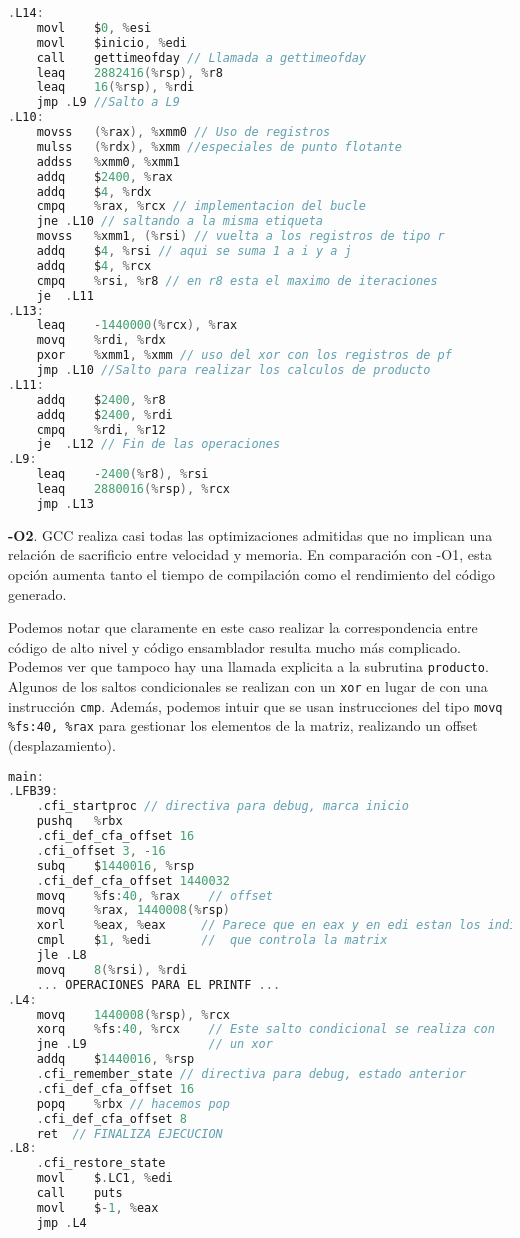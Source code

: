 \documentclass[10pt,a4paper]{article}
\begin{document}
\begin{lstlisting}[language=C]
.L14:
	movl	$0, %esi
	movl	$inicio, %edi
	call	gettimeofday // Llamada a gettimeofday
	leaq	2882416(%rsp), %r8		
	leaq	16(%rsp), %rdi
	jmp	.L9 //Salto a L9
.L10:
	movss	(%rax), %xmm0 // Uso de registros 
	mulss	(%rdx), %xmm //especiales de punto flotante
	addss	%xmm0, %xmm1
	addq	$2400, %rax 
	addq	$4, %rdx
	cmpq	%rax, %rcx // implementacion del bucle
	jne	.L10 // saltando a la misma etiqueta
	movss	%xmm1, (%rsi) // vuelta a los registros de tipo r
	addq	$4, %rsi // aqui se suma 1 a i y a j 
	addq	$4, %rcx
	cmpq	%rsi, %r8 // en r8 esta el maximo de iteraciones 
	je	.L11  
.L13:
	leaq	-1440000(%rcx), %rax
	movq	%rdi, %rdx
	pxor	%xmm1, %xmm // uso del xor con los registros de pf
	jmp	.L10 //Salto para realizar los calculos de producto 
.L11:
	addq	$2400, %r8
	addq	$2400, %rdi
	cmpq	%rdi, %r12
	je	.L12 // Fin de las operaciones 
.L9:
	leaq	-2400(%r8), %rsi  
	leaq	2880016(%rsp), %rcx
	jmp	.L13

\end{lstlisting}

\textbf{-O2}. GCC realiza casi todas las optimizaciones admitidas que no implican una relación de sacrificio entre velocidad y memoria. En comparación con -O1, esta opción aumenta tanto el tiempo de compilación como el rendimiento del código generado. 

Podemos notar que claramente en este caso realizar la correspondencia entre código de alto nivel y código ensamblador resulta mucho más complicado. Podemos ver que tampoco hay una llamada explicita a la subrutina \texttt{producto}. Algunos de los saltos condicionales se realizan con un \texttt{xor} en lugar de con una instrucción \texttt{cmp}. Además, podemos intuir que se usan instrucciones del tipo \texttt{movq \%fs:40, \%rax} para gestionar los elementos de la matriz, realizando un offset (desplazamiento).
\begin{lstlisting}[language=C]
main:
.LFB39:
	.cfi_startproc // directiva para debug, marca inicio
	pushq	%rbx  
	.cfi_def_cfa_offset 16
	.cfi_offset 3, -16
	subq	$1440016, %rsp
	.cfi_def_cfa_offset 1440032
	movq	%fs:40, %rax	// offset 
	movq	%rax, 1440008(%rsp)
	xorl	%eax, %eax     // Parece que en eax y en edi estan los indices
	cmpl	$1, %edi       //  que controla la matrix
	jle	.L8
	movq	8(%rsi), %rdi 
	... OPERACIONES PARA EL PRINTF ...
.L4:
	movq	1440008(%rsp), %rcx	
	xorq	%fs:40, %rcx    // Este salto condicional se realiza con 
	jne	.L9                 // un xor
	addq	$1440016, %rsp
	.cfi_remember_state // directiva para debug, estado anterior
	.cfi_def_cfa_offset 16
	popq	%rbx // hacemos pop 
	.cfi_def_cfa_offset 8
	ret  // FINALIZA EJECUCION 
.L8:
	.cfi_restore_state
	movl	$.LC1, %edi
	call	puts
	movl	$-1, %eax
	jmp	.L4
	
\end{lstlisting}
\end{document}
